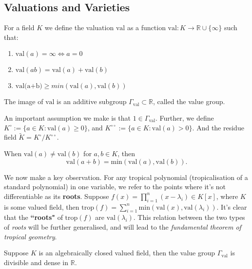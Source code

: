     \subsection{Valuations and Varieties}
    \begin{definition}
        For a field $K$ we define the valuation $\text{val}$ as a function $\text{val}: K \to \mathbb{R}\cup \{\infty\}$ such that:
        \begin{enumerate}
            \item $\text{val}(a) = \infty \Leftrightarrow a = 0$
            \item $\text{val}(ab) = \text{val}(a)+ \text{val}(b)$
            \item $\text{val(a+b)} \geq min(\text{val}(a),\text{val}(b))$
        \end{enumerate}
    The image of $\text{val}$ is an additive subgroup $\Gamma_{\text{val}} \subset \mathbb{R}$, called the value group.
    \end{definition} 
    An important assumption we make is that $1 \in \Gamma_{\text{val}}$. 
    Further, we define $K^{\circ} := \{a \in K: \text{val}(a)\geq 0\}$, and $K^{\circ \circ} := \{a \in K: \text{val}(a)> 0\}$. 
    And the residue field $\tilde{K} = K^{\circ}/K^{\circ \circ}$.
    \begin{lemma}
        \label{vallemma}
        When $\text{val}(a) \neq \text{val}(b)$ for $a,b \in K$, then
        \[
            \text{val}(a+b)= \text{min}(\text{val}(a),\text{val}(b)).
        \]
        
    \end{lemma}
    \begin{remark}
        \label{remark1}
    We now make a key observation. For any tropical polynomial (tropicalisation of a standard polynomial) in one variable, we refer to the points where it's not differentiable as its \textbf{roots}. 
    Suppose $f(x) = \prod_{i=1}^{n}(x-\lambda_i) \in K[x]$, where $K$ is some valued field, then $\text{trop}(f) = \sum_{i=1}^{n}\text{min}(\text{val}(x),\text{val}(\lambda_i))$. 
    It's clear that the \textbf{``roots"} of $\text{trop}(f)$ are $\text{val}(\lambda_i)$.
    This relation between the two types of \textit{roots} will be further generalised, and will lead to the \textit{fundamental theorem of tropical geometry}.
    \end{remark}
    \begin{lemma}
        Suppose $K$ is an algebraically closed valued field, then the value group $\Gamma_{\text{val}}$ is divisible and dense in $\mathbb{R}$.
    \end{lemma}
